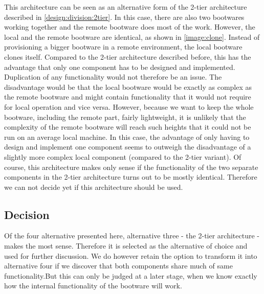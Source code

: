 This architecture can be seen as an alternative form of the 2-tier architecture described in \autoref{design:division:2tier}.
In this case, there are also two bootwares working together and the remote bootware does most of the work.
However, the local and the remote bootware are identical, as shown in \autoref{image:clone}.
Instead of provisioning a bigger bootware in a remote environment, the local bootware clones itself.
Compared to the 2-tier architecture described before, this has the advantage that only one component has to be designed and implemented.
Duplication of any functionality would not therefore be an issue.
The disadvantage would be that the local bootware would be exactly as complex as the remote bootware and might contain functionality that it would not require for local operation and vice versa.
However, because we want to keep the whole bootware, including the remote part, fairly lightweight, it is unlikely that the complexity of the remote bootware will reach such heights that it could not be run on an average local machine.
In this case, the advantage of only having to design and implement one component seems to outweigh the disadvantage of a slightly more complex local component (compared to the 2-tier variant).
Of course, this architecture makes only sense if the functionality of the two separate components in the 2-tier architecture turns out to be mostly identical.
Therefore we can not decide yet if this architecture should be used.

\subsection{Decision}

Of the four alternative presented here, alternative three - the 2-tier architecture - makes the most sense.
Therefore it is selected as the alternative of choice and used for further discussion.
We do however retain the option to transform it into alternative four if we discover that both components share much of same functionality.But this can only be judged at a later stage, when we know exactly how the internal functionality of the bootware will work.
